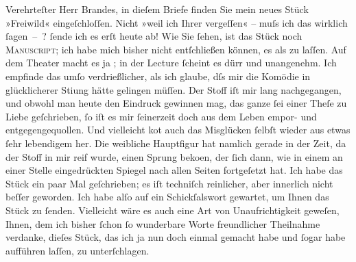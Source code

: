 \pstart{}Verehrteſter Herr Brandes,\pend\vspace{0.5em}
\pstart
           in dieſem Briefe finden Sie mein neues Stück »Freiwild« eingeſchloſſen. Nicht »weil ich Ihrer vergeſſen« – muſs ich das
               wirklich{ }ſagen – ?{ }ſende ich es erſt heute ab! Wie Sie{ }ſehen, ist das Stück noch \textsc{Manuscript}; {\pb}ich habe
               mich bisher nicht entſchließen können, es als \label{K_L00636-1v}\label{K_L00636-1} zu laſſen. Auf dem Theater macht es ja
              \label{K_L00636-2v}\label{K_L00636-2}; in der Lecture{ }ſcheint es dürr und
               unangenehm. Ich empfinde das umſo verdrießlicher, als ich glaube, dſs mir die Komödie
               in glücklicherer Sti{\geminationm}ung hätte gelingen müſſen. {\pb}Der Stoff iſt mir lang nachgegangen, und obwohl
               man heute den Eindruck gewinnen mag, das ganze{ }ſei einer Theſe zu Liebe geſchrieben,{ }ſo iſt es mir{ }ſeinerzeit doch aus dem Leben empor- und entgegengequollen. Und
               vielleicht ko{\geminationm}t auch das Misglücken{ }ſelbſt wieder aus
               etwas{ }ſehr lebendigem {\pb}her. Die weibliche
               Hauptfigur hat namlich gerade in der Zeit, da der Stoff in mir reif wurde, einen
               Sprung beko{\geminationm}en, der{ }ſich dann, wie in einem an einer
               Stelle eingedrückten Spiegel nach allen Seiten fortgeſetzt hat. Ich habe das Stück ein paar Mal geſchrieben;
               es iſt techniſch reinlicher, aber innerlich {\pb}nicht
               beſſer geworden. Ich habe alſo auf ein Schickſalswort gewartet, um Ihnen das Stück zu{ }ſenden. Vielleicht wäre es auch eine Art von Unaufrichtigkeit geweſen, Ihnen, dem ich
               bisher{ }ſchon{ }ſo wunderbare Worte freundlicher Theilnahme verdanke, dieſes Stück, das
               ich ja nun doch einmal {\pb}gemacht habe und{ }ſogar
               habe aufführen laſſen, zu unterſchlagen.\pend
           
